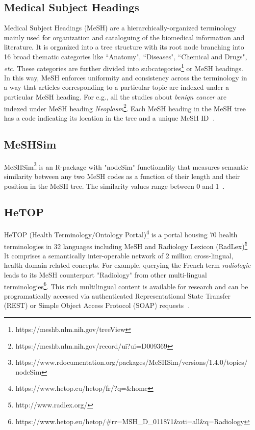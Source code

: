 \documentclass{IOS-Book-Article}
\begin{document}
\subsection{Medical Subject Headings}
%
Medical Subject Headings (MeSH) are a hierarchically-organized terminology mainly used for organization and cataloguing of the biomedical information and literature.
It is organized into a tree structure with its root node branching into 16 broad thematic categories like ``Anatomy", ``Diseases", ``Chemical and Drugs", \emph{etc.}
These categories are further divided into subcategories\footnote{https://meshb.nlm.nih.gov/treeView} or MeSH headings.
In this way, MeSH enforces uniformity and consistency across the terminology in a way that articles corresponding to a particular topic are indexed under a particular MeSH heading. For e.g., all the studies about \emph{benign cancer} are indexed under MeSH heading \emph{Neoplasm}\footnote{https://meshb.nlm.nih.gov/record/ui?ui=D009369}.
Each MeSH heading in the MeSH tree has a code indicating its location in the tree and a unique MeSH ID~\cite{mesh}.
%
\subsection{MeSHSim}
%
MeSHSim\footnote{https://www.rdocumentation.org/packages/MeSHSim/versions/1.4.0/topics/nodeSim} is an R-package with "nodeSim" functionality that measures semantic similarity between any two MeSH codes as a function of their length and their position in the MeSH tree. The similarity values range between 0 and 1~\cite{meshSim}.
%
\subsection{HeTOP}
%
HeTOP (Health Terminology/Ontology Portal)\footnote{https://www.hetop.eu/hetop/fr/?q=\&home} is a portal housing 70 health terminologies in 32 languages including MeSH and Radiology Lexicon (RadLex)\footnote{http://www.radlex.org/}
It comprises a semantically inter-operable network of 2 million cross-lingual, health-domain related concepts.
For example, querying the French term \emph{radiologie} leads to its MeSH counterpart "Radiology" from other multi-lingual terminologies\footnote{https://www.hetop.eu/hetop/\#rr=MSH\_D\_011871\&oti=all\&q=Radiology}.
This rich multilingual content is available for research and can be programatically accessed via authenticated Representational State Transfer (REST) or Simple Object Access Protocol (SOAP) requests~\cite{hetop}.
%
\end{document}
